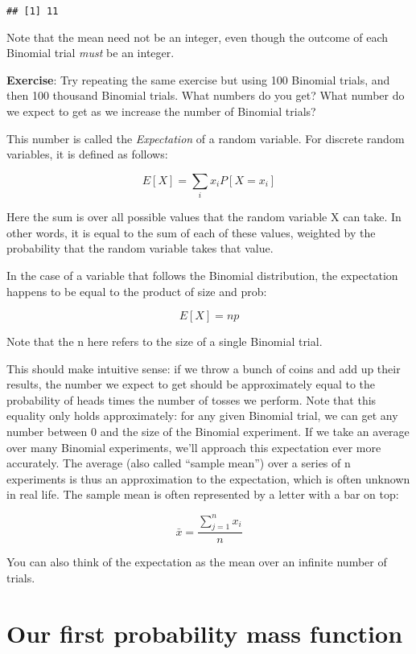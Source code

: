 \documentclass[
]{book}
\begin{document}
\begin{verbatim}
## [1] 11
\end{verbatim}

Note that the mean need not be an integer, even though the outcome of each Binomial trial \emph{must} be an integer.

\textbf{Exercise}: Try repeating the same exercise but using 100 Binomial trials, and then 100 thousand Binomial trials. What numbers do you get? What number do we expect to get as we increase the number of Binomial trials?

This number is called the \emph{Expectation} of a random variable. For discrete random variables, it is defined as follows:

\[E[X] = \sum_{i}x_iP[X=x_i]\]

Here the sum is over all possible values that the random variable X can take. In other words, it is equal to the sum of each of these values, weighted by the probability that the random variable takes that value.

In the case of a variable that follows the Binomial distribution, the expectation happens to be equal to the product of size and prob:

\[E[X] = np\]

Note that the n here refers to the size of a single Binomial trial.

This should make intuitive sense: if we throw a bunch of coins and add up their results, the number we expect to get should be approximately equal to the probability of heads times the number of tosses we perform. Note that this equality only holds approximately: for any given Binomial trial, we can get any number between 0 and the size of the Binomial experiment. If we take an average over many Binomial experiments, we'll approach this expectation ever more accurately. The average (also called ``sample mean'') over a series of n experiments is thus an approximation to the expectation, which is often unknown in real life. The sample mean is often represented by a letter with a bar on top:

\[\bar{x} = \frac{\sum_{j=1}^{n}x_{i}}{n}\]

You can also think of the expectation as the mean over an infinite number of trials.

\hypertarget{our-first-probability-mass-function}{%
\section{Our first probability mass function}\label{our-first-probability-mass-function}}
\end{document}
